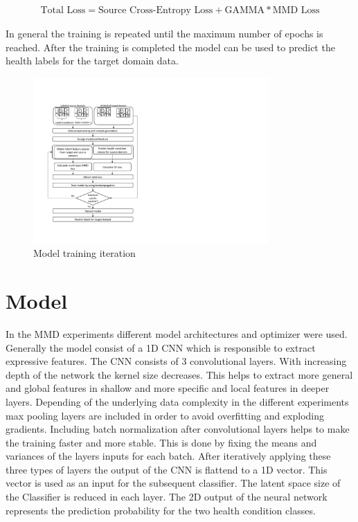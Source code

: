\begin{align}
    \mbox{Total Loss} = \mbox{Source Cross-Entropy Loss} + \mbox{GAMMA} * \mbox{MMD Loss}
\end{align}

In general the training is repeated until the maximum number of epochs is reached. After the training is completed the model can be used to predict the health labels for the target domain data. 

\begin{figure}[htpb]
  \centering
  \includegraphics[width=0.8\textwidth]{training_process_mmd.pdf}
  \caption {Model training iteration} \label{fig:Training_Process_MMD}
\end{figure}


\section{Model}
In the MMD experiments different model architectures and optimizer were used. Generally the model consist of a 1D CNN which is responsible to extract expressive features. The CNN consists of 3 convolutional layers. With increasing depth of the network the kernel size decreases. This helps to extract more general and global features in shallow and more specific and local features in deeper layers. Depending of the underlying data complexity in the different experiments max pooling layers are included in order to avoid overfitting and exploding gradients. Including batch normalization after convolutional layers helps to make the training faster and more stable. This is done by fixing the means and variances of the layers inputs for each batch. After iteratively applying these three types of layers the output of the CNN is flattend to a 1D vector. This vector is used as an input for the subsequent classifier. The latent space size of the Classifier is reduced in each layer. The 2D output of the neural network represents the prediction probability for the two health condition classes.

